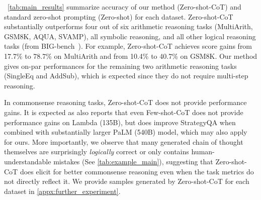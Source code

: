 \documentclass{article}
\newcommand{\ours}{Zero-shot-CoT\xspace}
\newcommand{\theirs}{Few-shot-CoT\xspace}
\newcommand{\theirsz}{Zero-shot\xspace}
\begin{document}
~\autoref{tab:main_results} summarize accuracy of our method (\ours) and standard zero-shot prompting (\theirsz) for each dataset. 
\ours substantially outperforms four out of six arithmetic reasoning tasks (MultiArith, GSM8K, AQUA, SVAMP), all symbolic reasoning, and all other logical reasoning tasks (from BIG-bench~\citep{bigbench}).
For example, \ours achieves score gains from 17.7\% to 78.7\% on MultiArith and from 10.4\% to 40.7\% on GSM8K. 
Our method gives on-par performances for the remaining two arithmetic reasoning tasks (SingleEq and AddSub), which is expected since they do not require multi-step reasoning. 

In commonsense reasoning tasks, \ours does not provide performance gains. 
It is expected as \citet{cot_wei} also reports that even \theirs does not provide performance gains on Lambda (135B), but does improve StrategyQA when combined with substantially larger PaLM (540B) model, which may also apply for ours. 
More importantly, we observe that many generated chain of thought themselves are surprisingly \textit{logically} correct or only contains human-understandable mistakes (See \autoref{tab:example_main}), suggesting that \ours does elicit for better commonsense reasoning even when the task metrics do not directly reflect it. 
We provide samples generated by \ours for each dataset in \autoref{appx:further_experiment}. 
\end{document}

